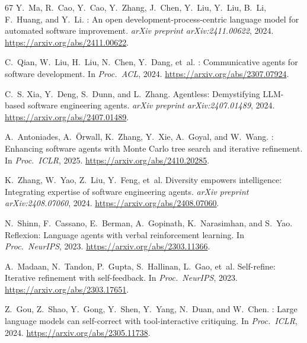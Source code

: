 \documentclass[11pt,a4paper]{article}
\begin{document}
\begin{thebibliography}{67}
Y.~Ma, R.~Cao, Y.~Cao, Y.~Zhang, J.~Chen, Y.~Liu, Y.~Liu, B.~Li, F.~Huang, and Y.~Li.
: An open development-process-centric language model for automated software improvement.
\newblock \emph{arXiv preprint arXiv:2411.00622}, 2024.
\newblock \url{https://arxiv.org/abs/2411.00622}.

C.~Qian, W.~Liu, H.~Liu, N.~Chen, Y.~Dang, et~al.
: Communicative agents for software development.
\newblock In \emph{Proc.\ ACL}, 2024.
\newblock \url{https://arxiv.org/abs/2307.07924}.

C.~S. Xia, Y.~Deng, S.~Dunn, and L.~Zhang.
\newblock Agentless: Demystifying {LLM}-based software engineering agents.
\newblock \emph{arXiv preprint arXiv:2407.01489}, 2024.
\newblock \url{https://arxiv.org/abs/2407.01489}.

A.~Antoniades, A.~{\"O}rwall, K.~Zhang, Y.~Xie, A.~Goyal, and W.~Wang.
: Enhancing software agents with {Monte Carlo} tree search and iterative refinement.
\newblock In \emph{Proc.\ ICLR}, 2025.
\newblock \url{https://arxiv.org/abs/2410.20285}.

K.~Zhang, W.~Yao, Z.~Liu, Y.~Feng, et~al.
\newblock Diversity empowers intelligence: Integrating expertise of software engineering agents.
\newblock \emph{arXiv preprint arXiv:2408.07060}, 2024.
\newblock \url{https://arxiv.org/abs/2408.07060}.


N.~Shinn, F.~Cassano, E.~Berman, A.~Gopinath, K.~Narasimhan, and S.~Yao.
\newblock Reflexion: Language agents with verbal reinforcement learning.
\newblock In \emph{Proc.\ NeurIPS}, 2023.
\newblock \url{https://arxiv.org/abs/2303.11366}.

A.~Madaan, N.~Tandon, P.~Gupta, S.~Hallinan, L.~Gao, et~al.
\newblock Self-refine: Iterative refinement with self-feedback.
\newblock In \emph{Proc.\ NeurIPS}, 2023.
\newblock \url{https://arxiv.org/abs/2303.17651}.

Z.~Gou, Z.~Shao, Y.~Gong, Y.~Shen, Y.~Yang, N.~Duan, and W.~Chen.
: Large language models can self-correct with tool-interactive critiquing.
\newblock In \emph{Proc.\ ICLR}, 2024.
\newblock \url{https://arxiv.org/abs/2305.11738}.


\end{thebibliography}
\end{document}
